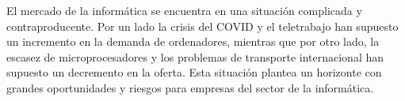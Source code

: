El mercado de la informática se encuentra en una situación complicada y contraproducente. Por un lado la crisis del COVID y el teletrabajo han supuesto un incremento en la demanda de ordenadores, mientras que por otro lado, la escasez de microprocesadores y los problemas de transporte internacional han supuesto un decremento en la oferta. Esta situación plantea un horizonte con grandes oportunidades y riesgos para empresas del sector de la informática.

